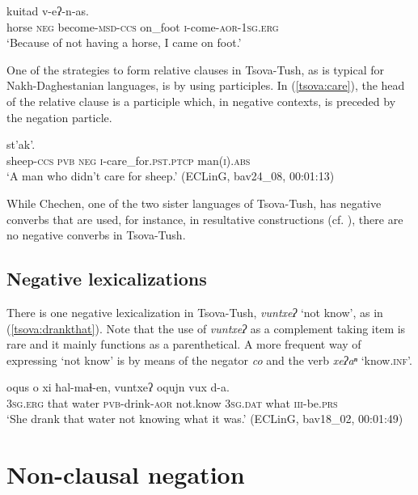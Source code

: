 \documentclass[output=paper,%
colorlinks,citecolor=brown,
showindex
]{langscibook}
\begin{document}
\ea	\label{tsova:horse}
	kuitad	v-eʔ-n-as.\\  
	horse \textsc{neg} become-\textsc{msd}-\textsc{ccs} on\_foot \textsc{i}-come-\textsc{aor}-\textsc{1sg.erg}\\
\glt `Because of not having a horse, I came on foot.' \citep[204]{HoliskyGagua1994} 
\z

One of the strategies to form relative clauses in Tsova-Tush, as is typical for Nakh-Daghestanian languages, is by using participles. In (\ref{tsova:care}), the head of the relative clause is a participle which, in negative contexts, is preceded by the negation particle. 


\ea	\label{tsova:care}
	st’ak’.\\
	sheep-\textsc{ccs} \textsc{pvb} \textsc{neg} \textsc{i}-care\_for.\textsc{pst.ptcp} man\textsc{(i).abs}\\
\glt `A man who didn’t care for sheep.' (ECLinG, bav24\_08, 00:01:13)
\z

While Chechen, one of the two sister languages of Tsova-Tush, has negative converbs that are used, for instance, in resultative constructions (cf. \citealt[146]{Molochieva2010}), there are no negative converbs in Tsova-Tush.

\subsection{Negative lexicalizations}
\label{tsova:neglex}

There is one negative lexicalization in Tsova-Tush, \textit{vuntxeʔ} `not know', as in (\ref{tsova:drankthat}). Note that the use of  \textit{vuntxeʔ} as a complement taking item is rare and it mainly functions as a parenthetical. A more frequent way of expressing `not know' is by means of the negator \textit{co} and the verb \textit{xeʔaⁿ} `know.\textsc{inf}'. 

\ea	\label{tsova:drankthat}
\gll 	oqus o xi ħal-maɬ-en, vuntxeʔ oqujn vux d-a.\\  
	\textsc{3sg.erg} that	water	\textsc{pvb}-drink-\textsc{aor}	not.know	\textsc{3sg.dat}		what \textsc{iii}-be.\textsc{prs}\\
\glt `She drank that water not knowing what it was.'  (ECLinG, bav18\_02, 00:01:49)
\z

\section{Non-clausal negation}
\label{tsova:nonclausal}
\end{document}
